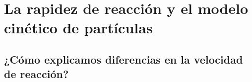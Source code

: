 \newpage \thispagestyle{plain}
\section{La rapidez de reacción y el modelo cinético de partículas}
\subsection{¿Cómo explicamos diferencias en la velocidad de reacción?}
